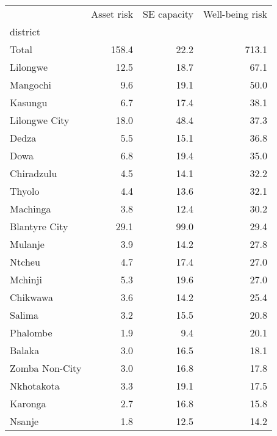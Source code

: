 \begin{tabular}{lrrr}
\toprule
{} &  Asset risk &  SE capacity &  Well-being risk \\
district       &             &              &                  \\
\midrule
Total          &       158.4 &         22.2 &            713.1 \\
Lilongwe       &        12.5 &         18.7 &             67.1 \\
Mangochi       &         9.6 &         19.1 &             50.0 \\
Kasungu        &         6.7 &         17.4 &             38.1 \\
Lilongwe City  &        18.0 &         48.4 &             37.3 \\
Dedza          &         5.5 &         15.1 &             36.8 \\
Dowa           &         6.8 &         19.4 &             35.0 \\
Chiradzulu     &         4.5 &         14.1 &             32.2 \\
Thyolo         &         4.4 &         13.6 &             32.1 \\
Machinga       &         3.8 &         12.4 &             30.2 \\
Blantyre City  &        29.1 &         99.0 &             29.4 \\
Mulanje        &         3.9 &         14.2 &             27.8 \\
Ntcheu         &         4.7 &         17.4 &             27.0 \\
Mchinji        &         5.3 &         19.6 &             27.0 \\
Chikwawa       &         3.6 &         14.2 &             25.4 \\
Salima         &         3.2 &         15.5 &             20.8 \\
Phalombe       &         1.9 &          9.4 &             20.1 \\
Balaka         &         3.0 &         16.5 &             18.1 \\
Zomba Non-City &         3.0 &         16.8 &             17.8 \\
Nkhotakota     &         3.3 &         19.1 &             17.5 \\
Karonga        &         2.7 &         16.8 &             15.8 \\
Nsanje         &         1.8 &         12.5 &             14.2 \\

\end{tabular}
